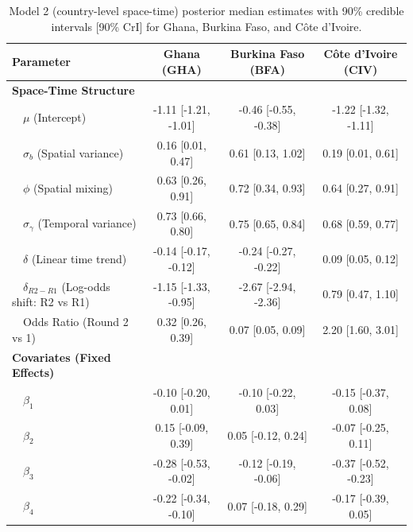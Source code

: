 \documentclass{article}
\begin{document}
\begin{table}[!h]
\centering
\caption{\label{tab:spacetime-params}Model 2 (country-level space-time) posterior median estimates with 90\% credible intervals [90\% CrI] for Ghana, Burkina Faso, and Côte d'Ivoire. \label{tab:m2-params-all}}
\centering
\fontsize{8}{10}\selectfont
\begin{tabular}[t]{lccc}
\toprule
Parameter & Ghana (GHA) & Burkina Faso (BFA) & Côte d'Ivoire (CIV)\\
\midrule
\textbf{Space-Time Structure} &  &  & \\
\hspace{1em}~~$\mu$ (Intercept) & -1.11 [-1.21, -1.01] & -0.46 [-0.55, -0.38] & -1.22 [-1.32, -1.11]\\
\hspace{1em}~~$\sigma_b$ (Spatial variance) & 0.16 [0.01, 0.47] & 0.61 [0.13, 1.02] & 0.19 [0.01, 0.61]\\
\hspace{1em}~~$\phi$ (Spatial mixing) & 0.63 [0.26, 0.91] & 0.72 [0.34, 0.93] & 0.64 [0.27, 0.91]\\
\hspace{1em}~~$\sigma_\gamma$ (Temporal variance) & 0.73 [0.66, 0.80] & 0.75 [0.65, 0.84] & 0.68 [0.59, 0.77]\\
\addlinespace
\hspace{1em}~~$\delta$ (Linear time trend) & -0.14 [-0.17, -0.12] & -0.24 [-0.27, -0.22] & 0.09 [0.05, 0.12]\\
\hspace{1em}~~$\delta_{R2-R1}$ (Log-odds shift: R2 vs R1) & -1.15 [-1.33, -0.95] & -2.67 [-2.94, -2.36] & 0.79 [0.47, 1.10]\\
\hspace{1em}~~Odds Ratio (Round 2 vs 1) & 0.32 [0.26, 0.39] & 0.07 [0.05, 0.09] & 2.20 [1.60, 3.01]\\
\textbf{Covariates (Fixed Effects)} &  &  & \\
\hspace{1em}~~$\beta_1$ & -0.10 [-0.20, 0.01] & -0.10 [-0.22, 0.03] & -0.15 [-0.37, 0.08]\\
\addlinespace
\hspace{1em}~~$\beta_2$ & 0.15 [-0.09, 0.39] & 0.05 [-0.12, 0.24] & -0.07 [-0.25, 0.11]\\
\hspace{1em}~~$\beta_3$ & -0.28 [-0.53, -0.02] & -0.12 [-0.19, -0.06] & -0.37 [-0.52, -0.23]\\
\hspace{1em}~~$\beta_4$ & -0.22 [-0.34, -0.10] & 0.07 [-0.18, 0.29] & -0.17 [-0.39, 0.05]\\

\end{tabular}
\end{table}
\end{document}

